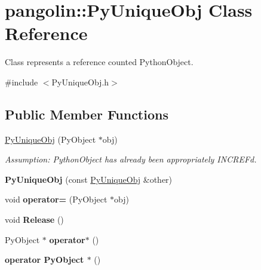 \hypertarget{classpangolin_1_1_py_unique_obj}{}\section{pangolin\+:\+:Py\+Unique\+Obj Class Reference}
\label{classpangolin_1_1_py_unique_obj}


Class represents a reference counted Python\+Object.  




{\ttfamily \#include $<$Py\+Unique\+Obj.\+h$>$}

\subsection*{Public Member Functions}
\begin{DoxyCompactItemize}
\item 
\hyperlink{classpangolin_1_1_py_unique_obj_abfaa0af0151225e61c271d3bd56870ed}{Py\+Unique\+Obj} (Py\+Object $\ast$obj)\hypertarget{classpangolin_1_1_py_unique_obj_abfaa0af0151225e61c271d3bd56870ed}{}\label{classpangolin_1_1_py_unique_obj_abfaa0af0151225e61c271d3bd56870ed}

\begin{DoxyCompactList}\small\item\em Assumption\+: Python\+Object has already been appropriately I\+N\+C\+R\+EF\textquotesingle{}d. \end{DoxyCompactList}\item 
{\bfseries Py\+Unique\+Obj} (const \hyperlink{classpangolin_1_1_py_unique_obj}{Py\+Unique\+Obj} \&other)\hypertarget{classpangolin_1_1_py_unique_obj_a5ec1ea99743b1665a284c8aa15a223eb}{}\label{classpangolin_1_1_py_unique_obj_a5ec1ea99743b1665a284c8aa15a223eb}

\item 
void {\bfseries operator=} (Py\+Object $\ast$obj)\hypertarget{classpangolin_1_1_py_unique_obj_a4a06ce387418f7dc023ca507a929c8fc}{}\label{classpangolin_1_1_py_unique_obj_a4a06ce387418f7dc023ca507a929c8fc}

\item 
void {\bfseries Release} ()\hypertarget{classpangolin_1_1_py_unique_obj_a4a3da785bbf7d591db2ae38629b12b7e}{}\label{classpangolin_1_1_py_unique_obj_a4a3da785bbf7d591db2ae38629b12b7e}

\item 
Py\+Object $\ast$ {\bfseries operator$\ast$} ()\hypertarget{classpangolin_1_1_py_unique_obj_a836d7dc785df9cb6363c26e2dbe53975}{}\label{classpangolin_1_1_py_unique_obj_a836d7dc785df9cb6363c26e2dbe53975}

\item 
{\bfseries operator Py\+Object $\ast$} ()\hypertarget{classpangolin_1_1_py_unique_obj_ac2663319ceff9bda46c106e67eb82bc3}{}\label{classpangolin_1_1_py_unique_obj_ac2663319ceff9bda46c106e67eb82bc3}

\end{DoxyCompactItemize}


